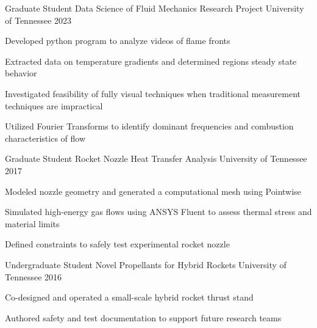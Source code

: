 
\begin{cventries}
  \cventry
    {Graduate Student}
    {Data Science of Fluid Mechanics Research Project} %
    {University of Tennessee} %
    {2023} %
    {
      \begin{cvitems} %
        \item {Developed python program to analyze videos of flame fronts}
        \item {Extracted data on temperature gradients and determined regions steady state behavior}
        \item {Investigated feasibility of fully visual techniques when traditional measurement techniques are impractical}
        \item {Utilized Fourier Transforms to identify dominant frequencies and combustion characteristics of flow}
      \end{cvitems}
    }

  \cventry
    {Graduate Student}
    {Rocket Nozzle Heat Transfer Analysis} %
    {University of Tennessee} %
    {2017} %
    {
      \begin{cvitems} %
        \item {Modeled nozzle geometry and generated a computational mesh using Pointwise}
        \item {Simulated high-energy gas flows using ANSYS Fluent to assess thermal stress and material limits}
        \item {Defined constraints to safely test experimental rocket nozzle}
      \end{cvitems}
    }

  \cventry
    {Undergraduate Student}
    {Novel Propellants for Hybrid Rockets} %
    {University of Tennessee} %
    {2016} %
    {
      \begin{cvitems} %
        \item {Co-designed and operated a small-scale hybrid rocket thrust stand}
		    \item {Authored safety and test documentation to support future research teams}
      \end{cvitems}
    }

\end{cventries}